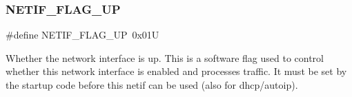 \subsubsection{\texorpdfstring{N\+E\+T\+I\+F\+\_\+\+F\+L\+A\+G\+\_\+\+UP}{NETIF\_FLAG\_UP}\hspace{0.1cm}{\footnotesize\ttfamily [2/2]}}
{\footnotesize\ttfamily \#define N\+E\+T\+I\+F\+\_\+\+F\+L\+A\+G\+\_\+\+UP~0x01U}

Whether the network interface is \textquotesingle{}up\textquotesingle{}. This is a software flag used to control whether this network interface is enabled and processes traffic. It must be set by the startup code before this netif can be used (also for dhcp/autoip). 